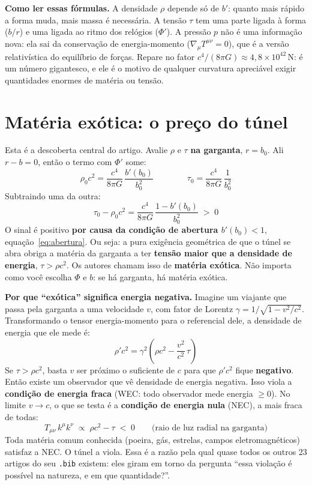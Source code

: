 \documentclass[11pt,a4paper]{article}
\begin{document}
\textbf{Como ler essas fórmulas.} A densidade $\rho$ depende só de $b'$: quanto mais rápido a forma muda, mais massa é
necessária. A tensão $\tau$ tem uma parte ligada à forma ($b/r$) e uma ligada ao ritmo dos relógios ($\Phi'$). A
pressão $p$ não é uma informação nova: ela sai da conservação de energia-momento ($\nabla_\mu T^{\mu\nu} = 0$), que é a
versão relativística do equilíbrio de forças. Repare no fator $c^4/(8\pi G) \approx 4{,}8\times 10^{42}$\,N: é um número
gigantesco, e ele é o motivo de qualquer curvatura apreciável exigir quantidades enormes de matéria ou tensão.

\section{Matéria exótica: o preço do túnel}
\label{sec:exotica}

Esta é a descoberta central do artigo. Avalie $\rho$ e $\tau$ \textbf{na garganta}, $r = b_0$. Ali $r - b = 0$, então
o termo com $\Phi'$ some:
\begin{equation*}
\rho_0 c^2 = \frac{c^4}{8\pi G}\,\frac{b'(b_0)}{b_0^2} \qquad\qquad \tau_0 = \frac{c^4}{8\pi G}\,\frac{1}{b_0^2}
\end{equation*}
Subtraindo uma da outra:
\begin{equation}
\tau_0 - \rho_0 c^2 = \frac{c^4}{8\pi G}\,\frac{1 - b'(b_0)}{b_0^2} \;>\; 0
\end{equation}
O sinal é positivo \textbf{por causa da condição de abertura $b'(b_0) < 1$}, equação~\eqref{eq:abertura}. Ou seja: a
pura exigência geométrica de que o túnel se abra obriga a matéria da garganta a ter \textbf{tensão maior que a
densidade de energia}, $\tau > \rho c^2$. Os autores chamam isso de \textbf{matéria exótica}. Não importa como você
escolha $\Phi$ e $b$: se há garganta, há matéria exótica.

\textbf{Por que ``exótica'' significa energia negativa.} Imagine um viajante que passa pela garganta a uma velocidade
$v$, com fator de Lorentz $\gamma = 1/\sqrt{1 - v^2/c^2}$. Transformando o tensor energia-momento para o referencial
dele, a densidade de energia que ele mede é:
\begin{equation}
\rho' c^2 = \gamma^2\left(\rho c^2 - \frac{v^2}{c^2}\,\tau\right)
\end{equation}
Se $\tau > \rho c^2$, basta $v$ ser próximo o suficiente de $c$ para que $\rho' c^2$ fique \textbf{negativo}. Então
existe um observador que vê densidade de energia negativa. Isso viola a \textbf{condição de energia fraca} (WEC: todo
observador mede energia $\ge 0$). No limite $v \to c$, o que se testa é a \textbf{condição de energia nula} (NEC), a
mais fraca de todas:
\begin{equation}
T_{\mu\nu}\,k^\mu k^\nu \;\propto\; \rho c^2 - \tau \;<\; 0 \qquad \text{(raio de luz radial na garganta)}
\end{equation}
Toda matéria comum conhecida (poeira, gás, estrelas, campos eletromagnéticos) satisfaz a NEC. O túnel a viola. Essa é
a razão pela qual quase todos os outros 23 artigos do seu \texttt{.bib} existem: eles giram em torno da pergunta
``essa violação é possível na natureza, e em que quantidade?''.
\end{document}
